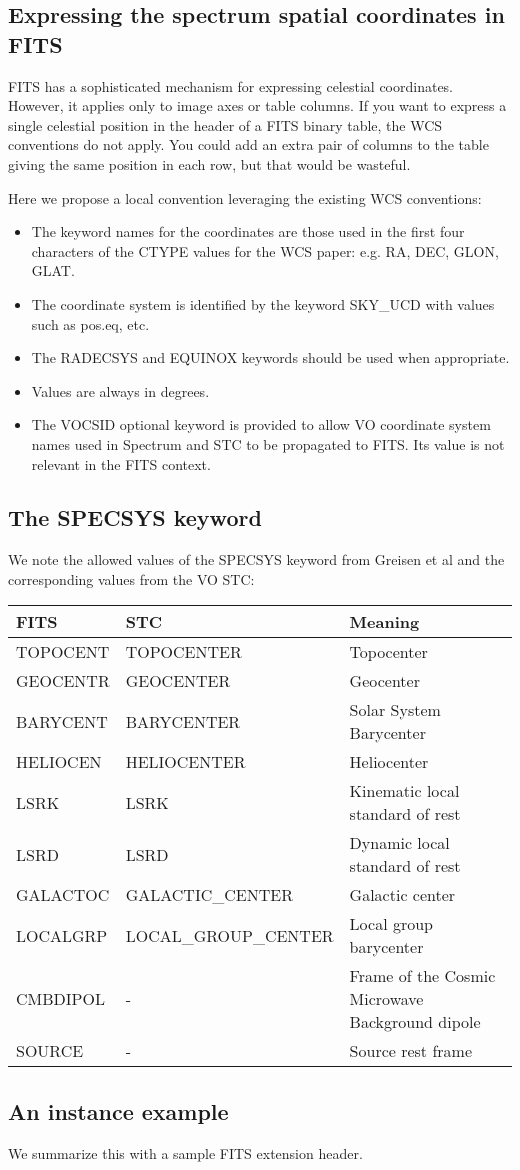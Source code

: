 \subsection{Expressing the spectrum spatial coordinates in FITS}

FITS has a sophisticated mechanism for expressing celestial
coordinates. However, it applies only to image axes or table
columns. If you want to express a single celestial position in the
header of a FITS binary table, the WCS conventions do not apply.
You could add an extra pair of columns to the table giving the
same position in each row, but that would be wasteful.

Here we propose a local convention leveraging the existing
WCS conventions:
\begin{itemize}
\item The keyword names for the coordinates are those used
in the first four characters of the CTYPE values for the WCS paper:
e.g. RA, DEC, GLON, GLAT.
\item The coordinate system is identified by the keyword SKY\_UCD with
values such as pos.eq, etc.
\item The RADECSYS and EQUINOX keywords should be used when appropriate.
\item Values are always in degrees.
\item The VOCSID optional keyword is provided to allow VO coordinate
system names used in Spectrum and STC to be propagated to FITS.
Its value is not relevant in the FITS context.
\end{itemize}



\subsection{The SPECSYS keyword}

We note the allowed values of the SPECSYS keyword from
Greisen et al and the corresponding values from the VO STC:

\vskip 0.1in

\colorbox{iblue}{
\begin{tabular}{lll}
\hline
FITS   & STC   & Meaning\\
\hline
TOPOCENT &TOPOCENTER & Topocenter\\
GEOCENTR &GEOCENTER & Geocenter\\
BARYCENT &BARYCENTER & Solar System Barycenter\\
HELIOCEN &HELIOCENTER & Heliocenter\\
LSRK     &LSRK & Kinematic local standard of rest\\
LSRD     &LSRD & Dynamic local standard of rest\\
GALACTOC &GALACTIC\_CENTER & Galactic center\\
LOCALGRP &LOCAL\_GROUP\_CENTER & Local group barycenter\\
CMBDIPOL &- & Frame of the Cosmic Microwave Background dipole\\
SOURCE   &- & Source rest frame \\
\hline
\end{tabular}
}

\clearpage

\subsection{An instance example}


We summarize this with a sample FITS extension header.


